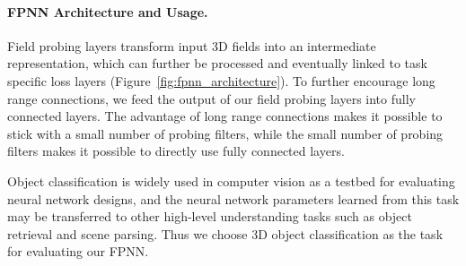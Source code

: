 \paragraph{FPNN Architecture and Usage.} Field probing layers transform input 3D fields into an intermediate representation, which can further be processed and eventually linked to task specific loss layers (Figure~\ref{fig:fpnn_architecture}). To further encourage long range connections, we feed the output of our field probing layers into fully connected layers. The advantage of long range connections makes it possible to stick with a small number of probing filters, while the small number of probing filters makes it possible to directly use fully connected layers.

Object classification is widely used in computer vision as a testbed for evaluating neural network designs, and the neural network parameters learned from this task may be transferred to other high-level understanding tasks such as object retrieval and scene parsing. Thus we choose 3D object classification as the task for evaluating our FPNN.

